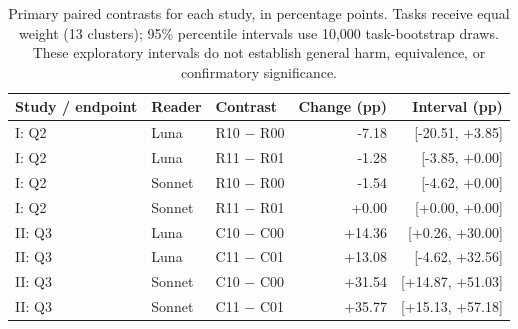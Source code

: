 \begin{table}[t]
\centering
\caption{Primary paired contrasts for each study, in percentage points. Tasks receive equal weight (13 clusters); 95\% percentile intervals use 10,000 task-bootstrap draws. These exploratory intervals do not establish general harm, equivalence, or confirmatory significance.}
\label{tab:contrasts}
\setlength{\tabcolsep}{4pt}
\begin{tabular*}{\textwidth}{@{\extracolsep{\fill}}lllrr@{}}
\toprule
Study / endpoint & Reader & Contrast & Change (pp) & Interval (pp) \\
\midrule
I: Q2 & Luna & R10 $-$ R00 & -7.18 & [-20.51, +3.85] \\
I: Q2 & Luna & R11 $-$ R01 & -1.28 & [-3.85, +0.00] \\
I: Q2 & Sonnet & R10 $-$ R00 & -1.54 & [-4.62, +0.00] \\
I: Q2 & Sonnet & R11 $-$ R01 & +0.00 & [+0.00, +0.00] \\
II: Q3 & Luna & C10 $-$ C00 & +14.36 & [+0.26, +30.00] \\
II: Q3 & Luna & C11 $-$ C01 & +13.08 & [-4.62, +32.56] \\
II: Q3 & Sonnet & C10 $-$ C00 & +31.54 & [+14.87, +51.03] \\
II: Q3 & Sonnet & C11 $-$ C01 & +35.77 & [+15.13, +57.18] \\
\bottomrule
\end{tabular*}
\end{table}
